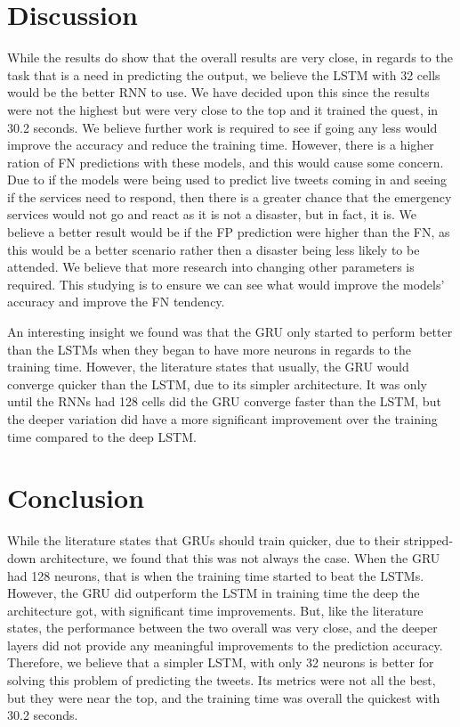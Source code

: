 \documentclass[a4paper,10pt]{article}
\begin{document}
\section{Discussion}
	While the results do show that the overall results are very close, in regards to the task that is a need in predicting the output, we believe the LSTM with 32 cells would be the better RNN to use. We have decided upon this since the results were not the highest but were very close to the top and it trained the quest, in 30.2 seconds. We believe further work is required to see if going any less would improve the accuracy and reduce the training time. However, there is a higher ration of FN predictions with these models, and this would cause some concern. Due to if the models were being used to predict live tweets coming in and seeing if the services need to respond, then there is a greater chance that the emergency services would not go and react as it is not a disaster, but in fact, it is. We believe a better result would be if the FP prediction were higher than the FN, as this would be a better scenario rather then a disaster being less likely to be attended. We believe that more research into changing other parameters is required. This studying is to ensure we can see what would improve the models' accuracy and improve the FN tendency.
	
	An interesting insight we found was that the GRU only started to perform better than the LSTMs when they began to have more neurons in regards to the training time. However, the literature states that usually, the GRU would converge quicker than the LSTM, due to its simpler architecture. It was only until the RNNs had 128 cells did the GRU converge faster than the LSTM, but the deeper variation did have a more significant improvement over the training time compared to the deep LSTM.
	
	

\section{Conclusion}
	While the literature states that GRUs should train quicker, due to their stripped-down architecture, we found that this was not always the case. When the GRU had 128 neurons, that is when the training time started to beat the LSTMs. However, the GRU did outperform the LSTM in training time the deep the architecture got, with significant time improvements. But, like the literature states, the performance between the two overall was very close, and the deeper layers did not provide any meaningful improvements to the prediction accuracy. Therefore, we believe that a simpler LSTM, with only 32 neurons is better for solving this problem of predicting the tweets. Its metrics were not all the best, but they were near the top, and the training time was overall the quickest with 30.2 seconds.
	
\end{document}
